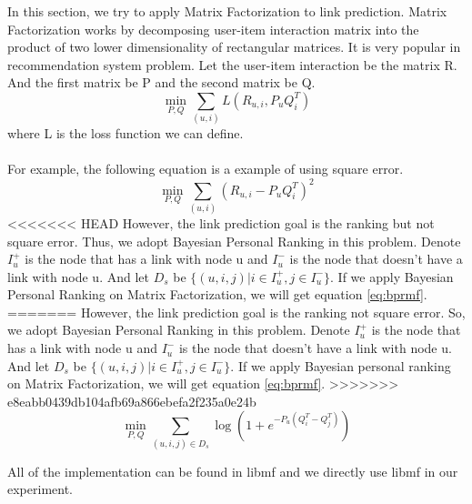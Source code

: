 \documentclass[12pt]{article}
\begin{document}
In this section, we try to apply Matrix Factorization to link prediction. Matrix Factorization works by decomposing user-item interaction matrix into the product of two lower dimensionality of rectangular matrices. It is very popular in recommendation system problem. Let the user-item interaction be the matrix R. And the first matrix be P and the second matrix be Q.  
\\
\begin{equation}
\min_{P,Q}{\sum_{(u,i)}{L(R_{u,i}, P_uQ_i^T)}}
\end{equation}
where L is the loss function we can define. \\
\\
For example, the following equation is a example of using square error. \\
\begin{equation}
\min_{P,Q}{\sum_{(u,i)}{(R_{u,i}-P_uQ_i^T)^2}}
\end{equation}
<<<<<<< HEAD
However, the link prediction goal is the ranking but not square error. Thus, we adopt Bayesian Personal Ranking\cite{bpr} in this problem. Denote $I_u^+$ is the node that has a link with node u and $I_u^-$ is the node that doesn't have a link with node u. And let $D_s$ be $\{(u,i,j)|i \in I_u^+, j \in I_u^-\}$. If we apply Bayesian Personal Ranking on Matrix Factorization, we will get equation \ref{eq:bprmf}.
=======
However, the link prediction goal is the ranking not square error. So, we adopt Bayesian Personal Ranking\cite{bpr} in this problem. Denote $I_u^+$ is the node that has a link with node u and $I_u^-$ is the node that doesn't have a link with node u. And let $D_s$ be $\{(u,i,j)|i \in I_u^+, j \in I_u^-\}$. If we apply Bayesian personal ranking on Matrix Factorization, we will get equation \ref{eq:bprmf}.
>>>>>>> e8eabb0439db104afb69a866ebefa2f235a0e24b
\begin{equation}
\min_{P,Q} \sum_{(u,i,j)\in D_s}\log(1+e^{-P_u(Q_i^T - Q_j^T)})
\label{eq:bprmf}
\end{equation}

All of the implementation can be found in libmf\cite{libmf} and we directly use libmf in our experiment.
\end{document}

